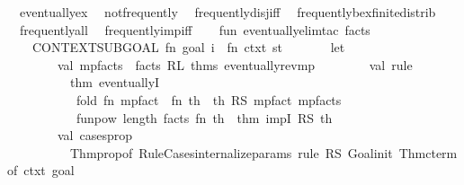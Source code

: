 \begin{isabellebody}
\ \ eventually{\isacharunderscore}{\kern0pt}ex\isanewline
\ \ not{\isacharunderscore}{\kern0pt}frequently\isanewline
\ \ frequently{\isacharunderscore}{\kern0pt}disj{\isacharunderscore}{\kern0pt}iff\isanewline
\ \ frequently{\isacharunderscore}{\kern0pt}bex{\isacharunderscore}{\kern0pt}finite{\isacharunderscore}{\kern0pt}distrib\isanewline
\ \ frequently{\isacharunderscore}{\kern0pt}all\isanewline
\ \ frequently{\isacharunderscore}{\kern0pt}imp{\isacharunderscore}{\kern0pt}iff\isanewline
%
\isadelimML
\isanewline
%
\endisadelimML
%
\isatagML
{}\isamarkupfalse%
\ {\isacartoucheopen}\isanewline
\ \ fun\ eventually{\isacharunderscore}{\kern0pt}elim{\isacharunderscore}{\kern0pt}tac\ facts\ {\isacharequal}{\kern0pt}\isanewline
\ \ \ \ CONTEXT{\isacharunderscore}{\kern0pt}SUBGOAL\ {\isacharparenleft}{\kern0pt}fn\ {\isacharparenleft}{\kern0pt}goal{\isacharcomma}{\kern0pt}\ i{\isacharparenright}{\kern0pt}\ {\isacharequal}{\kern0pt}{\isachargreater}{\kern0pt}\ fn\ {\isacharparenleft}{\kern0pt}ctxt{\isacharcomma}{\kern0pt}\ st{\isacharparenright}{\kern0pt}\ {\isacharequal}{\kern0pt}{\isachargreater}{\kern0pt}\isanewline
\ \ \ \ \ \ let\isanewline
\ \ \ \ \ \ \ \ val\ mp{\isacharunderscore}{\kern0pt}facts\ {\isacharequal}{\kern0pt}\ facts\ RL\ {\isacharat}{\kern0pt}{\isacharbraceleft}{\kern0pt}thms\ eventually{\isacharunderscore}{\kern0pt}rev{\isacharunderscore}{\kern0pt}mp{\isacharbraceright}{\kern0pt}\isanewline
\ \ \ \ \ \ \ \ val\ rule\ {\isacharequal}{\kern0pt}\isanewline
\ \ \ \ \ \ \ \ \ \ {\isacharat}{\kern0pt}{\isacharbraceleft}{\kern0pt}thm\ eventuallyI{\isacharbraceright}{\kern0pt}\isanewline
\ \ \ \ \ \ \ \ \ \ {\isacharbar}{\kern0pt}{\isachargreater}{\kern0pt}\ fold\ {\isacharparenleft}{\kern0pt}fn\ mp{\isacharunderscore}{\kern0pt}fact\ {\isacharequal}{\kern0pt}{\isachargreater}{\kern0pt}\ fn\ th\ {\isacharequal}{\kern0pt}{\isachargreater}{\kern0pt}\ th\ RS\ mp{\isacharunderscore}{\kern0pt}fact{\isacharparenright}{\kern0pt}\ mp{\isacharunderscore}{\kern0pt}facts\isanewline
\ \ \ \ \ \ \ \ \ \ {\isacharbar}{\kern0pt}{\isachargreater}{\kern0pt}\ funpow\ {\isacharparenleft}{\kern0pt}length\ facts{\isacharparenright}{\kern0pt}\ {\isacharparenleft}{\kern0pt}fn\ th\ {\isacharequal}{\kern0pt}{\isachargreater}{\kern0pt}\ {\isacharat}{\kern0pt}{\isacharbraceleft}{\kern0pt}thm\ impI{\isacharbraceright}{\kern0pt}\ RS\ th{\isacharparenright}{\kern0pt}\isanewline
\ \ \ \ \ \ \ \ val\ cases{\isacharunderscore}{\kern0pt}prop\ {\isacharequal}{\kern0pt}\isanewline
\ \ \ \ \ \ \ \ \ \ Thm{\isachardot}{\kern0pt}prop{\isacharunderscore}{\kern0pt}of\ {\isacharparenleft}{\kern0pt}Rule{\isacharunderscore}{\kern0pt}Cases{\isachardot}{\kern0pt}internalize{\isacharunderscore}{\kern0pt}params\ {\isacharparenleft}{\kern0pt}rule\ RS\ Goal{\isachardot}{\kern0pt}init\ {\isacharparenleft}{\kern0pt}Thm{\isachardot}{\kern0pt}cterm{\isacharunderscore}{\kern0pt}of\ ctxt\ goal{\isacharparenright}{\kern0pt}{\isacharparenright}{\kern0pt}{\isacharparenright}{\kern0pt}\isanewline

\end{isabellebody}
